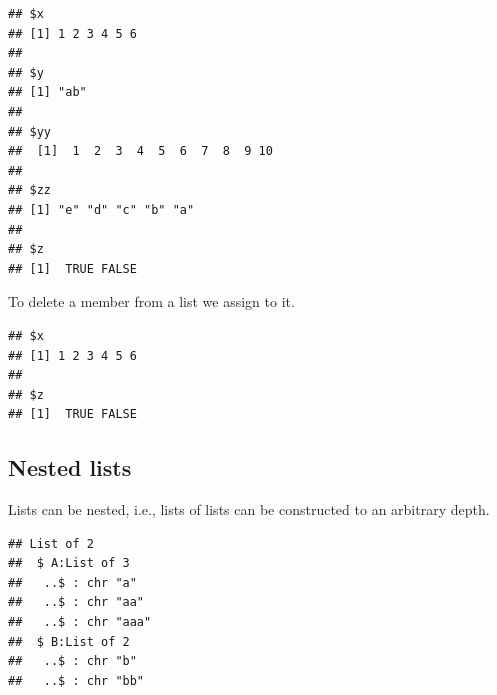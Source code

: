 \documentclass[krantz2]{krantz}\usepackage{knitr}
\begin{document}
\begin{knitrout}\footnotesize
{}\color{fgcolor}\begin{kframe}
\begin{alltt}
 \hlkwb{<-}  \hlstd{(} \hlstd{=} \hlopt{:}\hlstd{,}  \hlstd{= letters[}\hlopt{:}\hlstd{]),} \hlstd{)}
\end{alltt}
\begin{verbatim}
## $x
## [1] 1 2 3 4 5 6
## 
## $y
## [1] "ab"
## 
## $yy
##  [1]  1  2  3  4  5  6  7  8  9 10
## 
## $zz
## [1] "e" "d" "c" "b" "a"
## 
## $z
## [1]  TRUE FALSE
\end{verbatim}
\end{kframe}
\end{knitrout}

To delete a member from a list we assign  to it.

\begin{knitrout}\footnotesize
{}\color{fgcolor}\begin{kframe}
\begin{alltt}
\hlopt{$} \hlkwb{<-} 
\end{alltt}
\begin{verbatim}
## $x
## [1] 1 2 3 4 5 6
## 
## $z
## [1]  TRUE FALSE
\end{verbatim}
\end{kframe}
\end{knitrout}

\subsection{Nested lists}\label{sec:calc:lists:nested}

Lists can be nested, i.e., lists of lists can be constructed to an arbitrary depth.

\begin{knitrout}\footnotesize
{}\color{fgcolor}\begin{kframe}
\begin{alltt}
 \hlkwb{<-} \hlstd{(}\hlstd{,} \hlstd{,} \hlstd{)}
 \hlkwb{<-} \hlstd{(}\hlstd{,} \hlstd{)}
 \hlkwb{<-} \hlstd{(}   
\end{alltt}
\begin{verbatim}
## List of 2
##  $ A:List of 3
##   ..$ : chr "a"
##   ..$ : chr "aa"
##   ..$ : chr "aaa"
##  $ B:List of 2
##   ..$ : chr "b"
##   ..$ : chr "bb"
\end{verbatim}
\end{kframe}
\end{knitrout}
\end{document}
